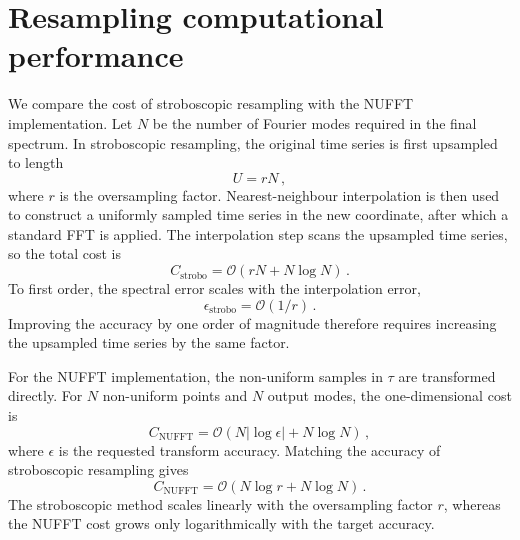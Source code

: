 \documentclass[aps,prd,amsmath,floats,floatfix, twocolumn,
superscriptaddress,nofootinbib,showpacs]{revtex4-2}
\begin{document}


\appendix

\section{Resampling computational performance}
\label{sec:nufft_performance}

We compare the cost of stroboscopic resampling with the NUFFT implementation.
Let $N$ be the number of Fourier modes required in the final spectrum.  In
stroboscopic resampling, the original time series is first upsampled to length
\begin{equation}
U = rN \, ,
\end{equation}
where $r$ is the oversampling factor.  Nearest-neighbour interpolation is then
used to construct a uniformly sampled time series in the new coordinate, after
which a standard FFT is applied.  The interpolation step scans the upsampled
time series, so the total cost is
\begin{equation}
C_\text{strobo} = \mathcal{O}(rN + N\log N) \, .
\end{equation}
To first order, the spectral error scales with the interpolation error,
\begin{equation}
\epsilon_\text{strobo} = \mathcal{O}(1/r) \, .
\end{equation}
Improving the accuracy by one order of magnitude therefore requires increasing
the upsampled time series by the same factor.

For the NUFFT implementation, the non-uniform samples in $\tau$ are transformed
directly.  For $N$ non-uniform points and $N$ output modes, the one-dimensional
cost is
\begin{equation}
C_\text{NUFFT} = \mathcal{O}\left(N|\log \epsilon| + N\log N\right) \, ,
\end{equation}
where $\epsilon$ is the requested transform accuracy.  Matching the accuracy of
stroboscopic resampling gives
\begin{equation}
C_\text{NUFFT} = \mathcal{O}\left(N\log r + N\log N\right) \, .
\end{equation}
The stroboscopic method scales linearly with the oversampling factor $r$,
whereas the NUFFT cost grows only logarithmically with the target accuracy.
\end{document}
